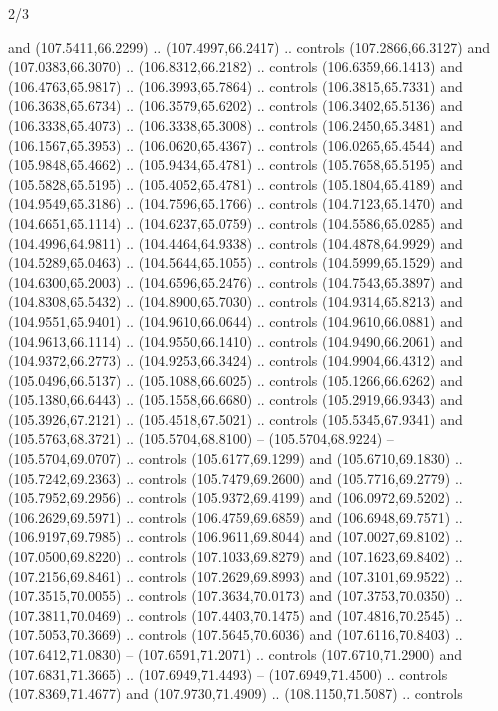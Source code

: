 \begin{flagdescription}{2/3}
\begin{scope}[shift={(0.5\flaglength,0.5)},scale=\flagwidth/320]
\begin{scope}[y=0.8pt, x=0.8pt, yscale=-1,shift={(-118.3,-146)}]
  and (107.5411,66.2299) .. (107.4997,66.2417) .. controls (107.2866,66.3127)
  and (107.0383,66.3070) .. (106.8312,66.2182) .. controls (106.6359,66.1413)
  and (106.4763,65.9817) .. (106.3993,65.7864) .. controls (106.3815,65.7331)
  and (106.3638,65.6734) .. (106.3579,65.6202) .. controls (106.3402,65.5136)
  and (106.3338,65.4073) .. (106.3338,65.3008) .. controls (106.2450,65.3481)
  and (106.1567,65.3953) .. (106.0620,65.4367) .. controls (106.0265,65.4544)
  and (105.9848,65.4662) .. (105.9434,65.4781) .. controls (105.7658,65.5195)
  and (105.5828,65.5195) .. (105.4052,65.4781) .. controls (105.1804,65.4189)
  and (104.9549,65.3186) .. (104.7596,65.1766) .. controls (104.7123,65.1470)
  and (104.6651,65.1114) .. (104.6237,65.0759) .. controls (104.5586,65.0285)
  and (104.4996,64.9811) .. (104.4464,64.9338) .. controls (104.4878,64.9929)
  and (104.5289,65.0463) .. (104.5644,65.1055) .. controls (104.5999,65.1529)
  and (104.6300,65.2003) .. (104.6596,65.2476) .. controls (104.7543,65.3897)
  and (104.8308,65.5432) .. (104.8900,65.7030) .. controls (104.9314,65.8213)
  and (104.9551,65.9401) .. (104.9610,66.0644) .. controls (104.9610,66.0881)
  and (104.9613,66.1114) .. (104.9550,66.1410) .. controls (104.9490,66.2061)
  and (104.9372,66.2773) .. (104.9253,66.3424) .. controls (104.9904,66.4312)
  and (105.0496,66.5137) .. (105.1088,66.6025) .. controls (105.1266,66.6262)
  and (105.1380,66.6443) .. (105.1558,66.6680) .. controls (105.2919,66.9343)
  and (105.3926,67.2121) .. (105.4518,67.5021) .. controls (105.5345,67.9341)
  and (105.5763,68.3721) .. (105.5704,68.8100) -- (105.5704,68.9224) --
  (105.5704,69.0707) .. controls (105.6177,69.1299) and (105.6710,69.1830) ..
  (105.7242,69.2363) .. controls (105.7479,69.2600) and (105.7716,69.2779) ..
  (105.7952,69.2956) .. controls (105.9372,69.4199) and (106.0972,69.5202) ..
  (106.2629,69.5971) .. controls (106.4759,69.6859) and (106.6948,69.7571) ..
  (106.9197,69.7985) .. controls (106.9611,69.8044) and (107.0027,69.8102) ..
  (107.0500,69.8220) .. controls (107.1033,69.8279) and (107.1623,69.8402) ..
  (107.2156,69.8461) .. controls (107.2629,69.8993) and (107.3101,69.9522) ..
  (107.3515,70.0055) .. controls (107.3634,70.0173) and (107.3753,70.0350) ..
  (107.3811,70.0469) .. controls (107.4403,70.1475) and (107.4816,70.2545) ..
  (107.5053,70.3669) .. controls (107.5645,70.6036) and (107.6116,70.8403) ..
  (107.6412,71.0830) -- (107.6591,71.2071) .. controls (107.6710,71.2900) and
  (107.6831,71.3665) .. (107.6949,71.4493) -- (107.6949,71.4500) .. controls
  (107.8369,71.4677) and (107.9730,71.4909) .. (108.1150,71.5087) .. controls

\end{scope}
\end{scope}
\end{flagdescription}
